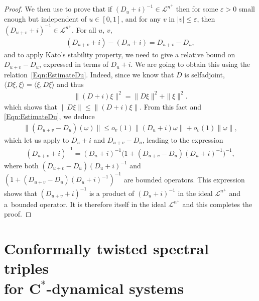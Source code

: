 \documentclass[11pt]{article}
\newcommand{\omegat}{\underline{\omega}}
\newcommand{\SymmIdeal}{\mathscr{L}}
\numberwithin{equation}{section}
\begin{document}
\begin{proof}
We then use \cite[Theorem~1.16, p.~196]{Kato} to prove that if $(D_u + i)^{-1} \in \SymmIdeal^{n^+}$ then for some $\varepsilon > 0$ small enough but independent of $u \in [0,1]$, and for any $v$ in $|v| \leqslant \varepsilon$, then $(D_{u+v} + i)^{-1} \in \SymmIdeal^{n^+}$. For all $u$, $v$,
\begin{gather*}
(D_{u+v} + i ) - (D_u + i) = D_{u+v} - D_u,
\end{gather*}
and to apply Kato's stability property, we need to give a relative bound on $D_{u+v} - D_u$, expressed in terms of $D_u +i$. We are going to obtain this using the relation~\eqref{Eqn:EstimateDu}. Indeed, since we know that $D$ is selfadjoint, $\langle D \xi, \xi \rangle = \langle \xi, D \xi \rangle $ and thus
\begin{gather*}
\| (D + i) \xi \|^2 = \| D \xi \|^2 + \| \xi \|^2.
\end{gather*}
which shows that $\| D \xi \| \leqslant \| (D + i) \xi \|$. From this fact and \eqref{Eqn:EstimateDu}, we deduce
\begin{gather*}
\| (D_{u+v} - D_u)(\omegat) \| \leqslant o_v(1) \| (D_u +i) \omegat \| + o_v(1) \| \omegat \|,
\end{gather*}
which let us apply \cite[Theorem~1.16, p.~196]{Kato} to $D_u +i$ and $D_{u+v} - D_u$, leading to the expression
\begin{gather*}
(D_{u+v} + i)^{-1} = (D_u + i)^{-1} \big(1 + (D_{u+v} - D_u)(D_u +i)^{-1}\big)^{-1},
\end{gather*}
where both $(D_{u+v} - D_u)(D_u +i)^{-1}$ and $(1 + (D_{u+v} - D_u)(D_u +i)^{-1})^{-1}$ are bounded operators. This expression shows that $(D_{u+v} + i)^{-1}$ is a product of $(D_u + i)^{-1}$ in the ideal $\SymmIdeal^{n^+}$ and a~bounded operator. It is therefore itself in the ideal $\SymmIdeal^{n^+}$ and this completes the proof.
\end{proof}
\setcounter{section}{3}
\setcounter{subsection}{0}
\setcounter{subsubsection}{0}
\setcounter{Theorem}{15}
\setcounter{equation}{11}
\section[Conformally twisted spectral triples for $C^*$-dynamical systems]{Conformally twisted spectral triples\\ for $\boldsymbol{C^*}$-dynamical systems}
\label{Sec:ConfTwistedTrSp}
\end{document}
